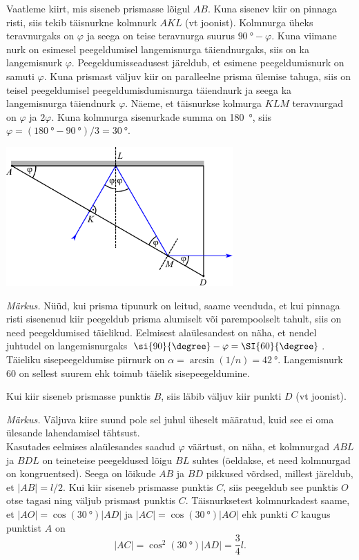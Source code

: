 \documentclass[11pt]{article}
\begin{document}
{{\osa Vaatleme kiirt, mis siseneb prismasse lõigul $AB$. Kuna sisenev kiir on pinnaga risti, siis tekib täisnurkne kolmnurk $AKL$ (vt joonist). Kolmnurga üheks teravnurgaks on $\varphi$ ja seega on teise teravnurga suurus $\SI{90}{\degree}-\varphi$. Kuna viimane nurk on esimesel peegeldumisel langemisnurga täiendnurgaks, siis on ka langemisnurk $\varphi$. Peegeldumisseadusest järeldub, et esimene peegeldumisnurk on samuti $\varphi$. Kuna prismast väljuv kiir on paralleelne prisma ülemise tahuga, siis on teisel peegeldumisel peegeldumisdumisnurga täiendnurk ja seega ka langemisnurga täiendnurk $\varphi$. Näeme, et täisnurkse kolmurga $KLM$ teravnurgad on $\varphi$ ja $2\varphi$. Kuna kolmnurga sisenurkade summa on \SI{180}{\degree}, siis $\varphi=(\SI{180}{\degree}-\SI{90}{\degree})/3=\SI{30}{\degree}$.

\begin{center}
 \includegraphics[width=0.65\textwidth]{2014-v3g-04-periskoopprillid_lahendus_joonis2.pdf}
\end{center}

\emph{Märkus.} Nüüd, kui prisma tipunurk on leitud, saame veenduda, et kui pinnaga risti sisenenud kiir peegeldub prisma alumiselt või parempoolselt tahult, siis on need peegeldumised täielikud. Eelmisest alaülesandest on näha, et nendel juhtudel on langemisnurgaks $\si{90}{\degree}-\varphi=\SI{60}{\degree}$. Täieliku sisepeegeldumise piirnurk on $\alpha=\arcsin(1/n)=\SI{42}{\degree}$. Langemisnurk \si{60}{\degree} on sellest suurem ehk toimub täielik sisepeegeldumine.

\osa Kui kiir siseneb prismasse punktis $B$, siis läbib väljuv kiir punkti $D$ (vt joonist).

\emph{Märkus.} Väljuva kiire suund pole sel juhul üheselt määratud, kuid see ei oma ülesande lahendamisel tähtsust.\\
Kasutades eelmises alaülesandes saadud $\varphi$ väärtust, on näha, et kolmnurgad $ABL$ ja $BDL$ on teineteise peegeldused lõigu $BL$ suhtes (öeldakse, et need kolmnurgad on kongruentsed). Seega on lõikude $AB$ ja $BD$ pikkused võrdsed, millest järeldub, et $|AB|=l/2$. Kui kiir siseneb prismasse punktis $C$, siis peegeldub see punktis $O$ otse tagasi ning väljub prismast punktis $C$. Täisnurksetest kolmnurkadest saame, et $|AO|=\cos(\SI{30}{\degree})|AD|$ ja $|AC|=\cos(\SI{30}{\degree})|AO|$ ehk punkti $C$ kaugus punktist $A$ on 
\[
|AC|=\cos^2(\SI{30}{\degree})|AD|=\frac{3}{4}l.
\]

}}
\end{document}
